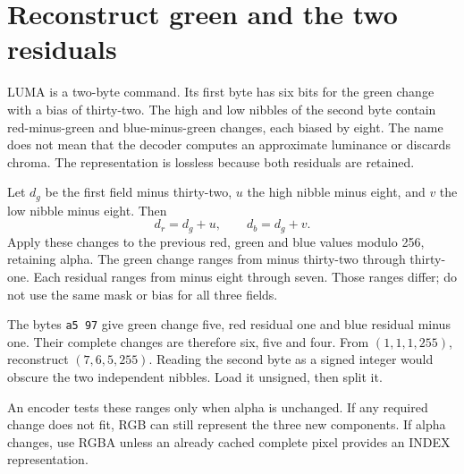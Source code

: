 \section{Reconstruct green and the two residuals}
LUMA is a two-byte command. Its first byte has six bits for the green change with a
bias of thirty-two. The high and low nibbles of the second byte contain red-minus-green
and blue-minus-green changes, each biased by eight. The name does not mean that the
decoder computes an approximate luminance or discards chroma. The representation is
lossless because both residuals are retained.

Let \(d_g\) be the first field minus thirty-two, \(u\) the high nibble minus eight,
and \(v\) the low nibble minus eight. Then
\[
  d_r=d_g+u,\qquad d_b=d_g+v.
\]
Apply these changes to the previous red, green and blue values modulo 256, retaining
alpha. The green change ranges from minus thirty-two through thirty-one. Each residual
ranges from minus eight through seven. Those ranges differ; do not use the same mask
or bias for all three fields.

The bytes \texttt{a5 97} give green change five, red residual one and blue residual
minus one. Their complete changes are therefore six, five and four. From
\((1,1,1,255)\), reconstruct \((7,6,5,255)\). Reading the second byte as a signed
integer would obscure the two independent nibbles. Load it unsigned, then split it.

An encoder tests these ranges only when alpha is unchanged. If any required change
does not fit, RGB can still represent the three new components. If alpha changes,
use RGBA unless an already cached complete pixel provides an INDEX representation.
